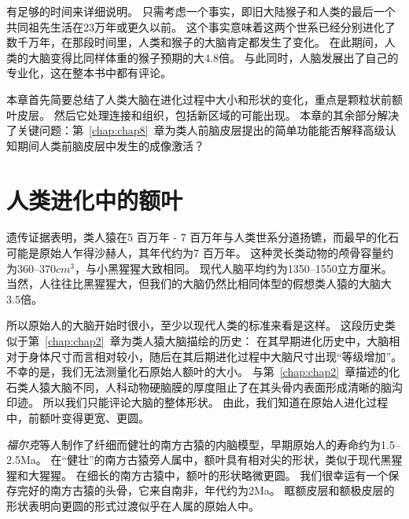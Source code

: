 有足够的时间来详细说明。
只需考虑一个事实，即旧大陆猴子和人类的最后一个共同祖先生活在23万年或更久以前\cite{kay2004anthropoid,kumar2005placing}。
这个事实意味着这两个世系已经分别进化了数千万年，在那段时间里，人类和猴子的大脑肯定都发生了变化。
在此期间，人类的大脑变得比同样体重的猴子预期的大4.8倍\cite{macleod2003expansion}。
与此同时，人脑发展出了自己的专业化，这在整本书中都有评论。
\par


本章首先简要总结了人类大脑在进化过程中大小和形状的变化，重点是颗粒状前额叶皮层。
然后它处理连接和组织，包括新区域的可能出现。
本章的其余部分解决了关键问题：第~\ref{chap:chap8}~章为类人前脑皮层提出的简单功能能否解释高级认知期间人类前脑皮层中发生的成像激活？



\section{人类进化中的额叶}

遗传证据表明，类人猿在5 百万年 - 7 百万年\cite{kumar2005placing}与人类世系分道扬镳，而最早的化石可能是原始人乍得沙赫人\cite{guy2005morphological}，其年代约为7 百万年\cite{le2009mammal}。
这种灵长类动物的颅骨容量约为360–370$cm^3$，与小黑猩猩大致相同\cite{guy2005morphological}。
现代人脑平均约为1350–1550立方厘米\cite{sowell2007sex}。
当然，人往往比黑猩猩大，但我们的大脑仍然比相同体型的假想类人猿的大脑大3.5倍\cite{macleod2003expansion}。
\par



所以原始人的大脑开始时很小，至少以现代人类的标准来看是这样。
这段历史类似于第~\ref{chap:chap2}~章为类人猿大脑描绘的历史：
在其早期进化历史中，大脑相对于身体尺寸而言相对较小，随后在其后期进化过程中大脑尺寸出现“等级增加”。
不幸的是，我们无法测量化石原始人额叶的大小。
与第~\ref{chap:chap2}~章描述的化石类人猿大脑不同，人科动物硬脑膜的厚度阻止了在其头骨内表面形成清晰的脑沟印迹。
所以我们只能评论大脑的整体形状。
由此，我们知道在原始人进化过程中，前额叶变得更宽、更圆。
\par


\textit{福尔克}等人\cite{falk2000early}制作了纤细而健壮的南方古猿的内脑模型，早期原始人的寿命约为1.5–2.5Ma。
在“健壮”的南方古猿旁人属中，额叶具有相对尖的形状，类似于现代黑猩猩和大猩猩。
在细长的南方古猿中，额叶的形状略微更圆。
我们很幸运有一个保存完好的南方古猿的头骨，它来自南非，年代约为2Ma\cite{carlson2011endocast}。
眶额皮层和额极皮层的形状表明向更圆的形式过渡似乎在人属的原始人中。
\par


